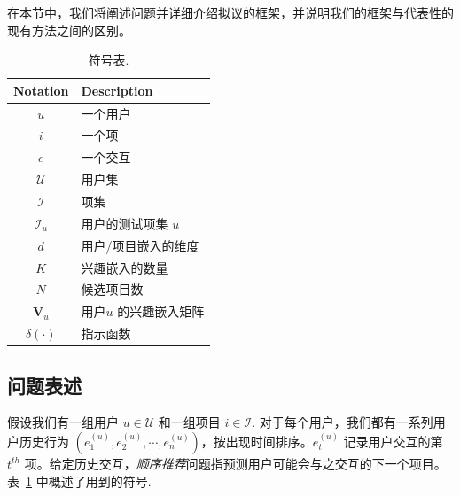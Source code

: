在本节中，我们将阐述问题并详细介绍拟议的框架，并说明我们的框架与代表性的现有方法之间的区别。

\begin{table}
  \centering
  \caption{\label{tab:notation} 符号表.}
  \begin{tabular}{c|p{2.55in}}
    \hline \hline
    \textbf{Notation} & \textbf{Description} \\
    \hline
    $u$ & 一个用户 \\
    $i$ & 一个项 \\
    $e$ & 一个交互 \\
    $\mathcal{U}$ & 用户集 \\
    $\mathcal{I}$ & 项集 \\
    $\mathcal{I}_u$ & 用户的测试项集 $u$ \\
    $d$ & 用户/项目嵌入的维度 \\
    $K$ & 兴趣嵌入的数量 \\
    $N$ & 候选项目数 \\
    $\mathbf{V}_u$ & 用户$u$ 的兴趣嵌入矩阵 \\
    $\delta(\cdot)$ & 指示函数 \\
    \hline \hline
  \end{tabular}
\end{table}

\subsection{问题表述}
假设我们有一组用户 $u\in \mathcal{U}$ 和一组项目 $i\in \mathcal{I}$. 对于每个用户，我们都有一系列用户历史行为 $(e^{(u)}_{1}, e^{(u)}_{2}, \cdots, e^{(u)}_{n})$，按出现时间排序。$e^{(u)}_{t}$ 记录用户交互的第 $t^{th}$ 项。给定历史交互，\textit{顺序推荐}问题指预测用户可能会与之交互的下一个项目。
表~\ref{tab:notation} 中概述了用到的符号.

